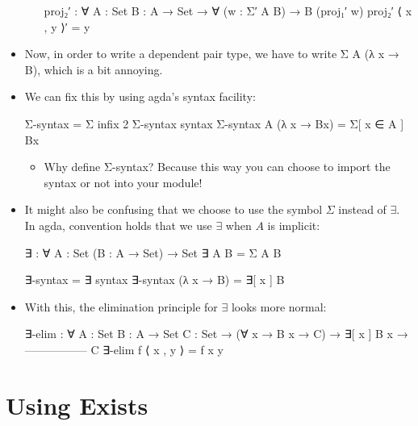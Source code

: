 \documentclass{lecturenotes}
\begin{document}
\begin{itemize}
\begin{itemize}
\begin{code}
proj₂′ : ∀ {A : Set} {B : A → Set} → ∀ (w : Σ′ A B) → B (proj₁′ w)
proj₂′ ⟨ x , y ⟩′ = y
\end{code}
\end{itemize}
\newpage
\item Now, in order to write a dependent pair type, we have to write \textsf{Σ A (λ x → B)}, which is a bit annoying.
\item We can fix this by using agda's syntax facility:
\begin{code}
Σ-syntax = Σ
infix 2 Σ-syntax
syntax Σ-syntax A (λ x → Bx) = Σ[ x ∈ A ] Bx    
\end{code}
\begin{itemize}
\item Why define \textsf{Σ-syntax}?
  Because this way you can choose to import the syntax or not into your module!
\end{itemize}
\item It might also be confusing that we choose to use the symbol $\Sigma$ instead of $\exists$.
  In agda, convention holds that we use $\exists$ when $A$ is implicit:
\begin{code}
∃ : ∀ {A : Set} (B : A → Set) → Set
∃ {A} B = Σ A B

∃-syntax = ∃
syntax ∃-syntax (λ x → B) = ∃[ x ] B
\end{code}
\item With this, the elimination principle for $\exists$ looks more normal:
\begin{code}
∃-elim : ∀ {A : Set} {B : A → Set} {C : Set} →
   (∀ x → B x → C) →
     ∃[ x ] B x →
  -----------------
          C
∃-elim f ⟨ x , y ⟩ = f x y    
\end{code}
\end{itemize}

\section{Using Exists}
\label{sec:using-exists}
\end{document}
